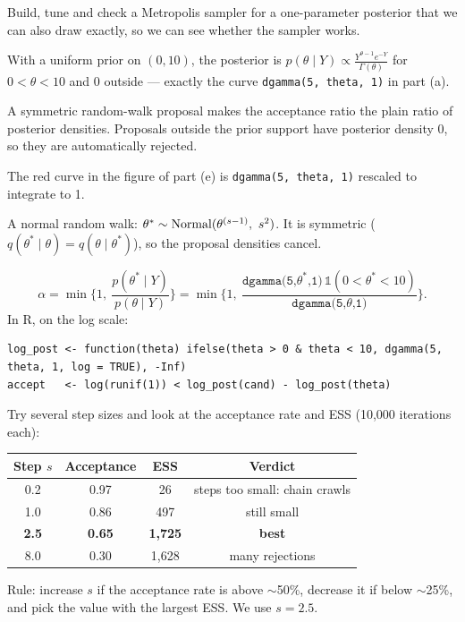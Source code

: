 \documentclass[11pt]{article}
\begin{document}
\begin{restate}
Build, tune and check a Metropolis sampler for a one-parameter posterior that we can also draw exactly, so we can see whether the sampler works.
\end{restate}

\begin{recall}
With a uniform prior on $(0,10)$, the posterior is $p(\theta\mid Y)\propto\frac{Y^{\theta-1}e^{-Y}}{\Gamma(\theta)}$ for $0<\theta<10$ and 0 outside --- exactly the curve \texttt{dgamma(5, theta, 1)} in part (a).
\end{recall}

\begin{keyidea}
A symmetric random-walk proposal makes the acceptance ratio the plain ratio of posterior densities. Proposals outside the prior support have posterior density 0, so they are automatically rejected.
\end{keyidea}

\solution
{} The red curve in the figure of part (e) is \texttt{dgamma(5, theta, 1)} rescaled to integrate to 1.

 A normal random walk: $\theta^*\sim\dist{Normal}(\theta^{(s-1)},\ s^2)$. It is symmetric ($q(\theta^*\mid\theta)=q(\theta\mid\theta^*)$), so the proposal densities cancel.

\[
\alpha=\min\Big\{1,\ \frac{p(\theta^*\mid Y)}{p(\theta\mid Y)}\Big\}=\min\Big\{1,\ \frac{\texttt{dgamma(5,}\theta^*\texttt{,1)}\,\mathbb 1(0<\theta^*<10)}{\texttt{dgamma(5,}\theta\texttt{,1)}}\Big\}.
\]
In R, on the log scale:
\begin{lstlisting}
log_post <- function(theta) ifelse(theta > 0 & theta < 10, dgamma(5, theta, 1, log = TRUE), -Inf)
accept   <- log(runif(1)) < log_post(cand) - log_post(theta)
\end{lstlisting}

 Try several step sizes and look at the acceptance rate and ESS (10{,}000 iterations each):
\begin{center}
\begin{tabular}{cccc}\toprule
Step $s$ & Acceptance & ESS & Verdict\\\midrule
0.2 & 0.97 & 26 & steps too small: chain crawls\\
1.0 & 0.86 & 497 & still small\\
\textbf{2.5} & \textbf{0.65} & \textbf{1{,}725} & \textbf{best}\\
8.0 & 0.30 & 1{,}628 & many rejections\\\bottomrule
\end{tabular}
\end{center}
Rule: increase $s$ if the acceptance rate is above $\sim$50\%, decrease it if below $\sim$25\%, and pick the value with the largest ESS. We use $s=2.5$.
\end{document}

